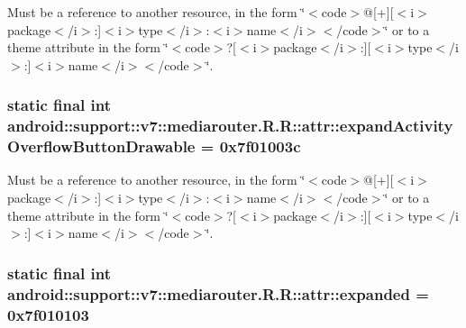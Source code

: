 Must be a reference to another resource, in the form \char`\"{}$<$code$>$@\mbox{[}+\mbox{]}\mbox{[}$<$i$>$package$<$/i$>$:\mbox{]}$<$i$>$type$<$/i$>$:$<$i$>$name$<$/i$>$$<$/code$>$\char`\"{} or to a theme attribute in the form \char`\"{}$<$code$>$?\mbox{[}$<$i$>$package$<$/i$>$:\mbox{]}\mbox{[}$<$i$>$type$<$/i$>$:\mbox{]}$<$i$>$name$<$/i$>$$<$/code$>$\char`\"{}. \hypertarget{classandroid_1_1support_1_1v7_1_1mediarouter_1_1_r_1_1attr_a886d2fc65da168783ffc3c75a408821}{
\subsubsection[{expandActivityOverflowButtonDrawable}]{\setlength{\rightskip}{0pt plus 5cm}static final int android::support::v7::mediarouter.R.R::attr::expandActivityOverflowButtonDrawable = 0x7f01003c}}
\label{classandroid_1_1support_1_1v7_1_1mediarouter_1_1_r_1_1attr_a886d2fc65da168783ffc3c75a408821}


Must be a reference to another resource, in the form \char`\"{}$<$code$>$@\mbox{[}+\mbox{]}\mbox{[}$<$i$>$package$<$/i$>$:\mbox{]}$<$i$>$type$<$/i$>$:$<$i$>$name$<$/i$>$$<$/code$>$\char`\"{} or to a theme attribute in the form \char`\"{}$<$code$>$?\mbox{[}$<$i$>$package$<$/i$>$:\mbox{]}\mbox{[}$<$i$>$type$<$/i$>$:\mbox{]}$<$i$>$name$<$/i$>$$<$/code$>$\char`\"{}. \hypertarget{classandroid_1_1support_1_1v7_1_1mediarouter_1_1_r_1_1attr_48993a8b797057962d8c892ec7b85a73}{
\subsubsection[{expanded}]{\setlength{\rightskip}{0pt plus 5cm}static final int android::support::v7::mediarouter.R.R::attr::expanded = 0x7f010103}}
\label{classandroid_1_1support_1_1v7_1_1mediarouter_1_1_r_1_1attr_48993a8b797057962d8c892ec7b85a73}


